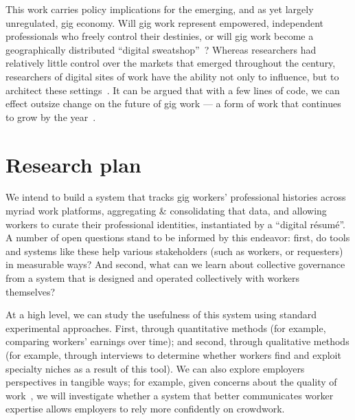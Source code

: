 \documentclass{article}
\newcommand{\topic}[1]{{\color{Blue}#1}}
\begin{document}
\topic{This work carries policy implications for the emerging, and as yet largely unregulated, gig economy.}
Will gig work represent empowered, independent professionals who freely control their destinies, or 
will gig work become a geographically distributed ``digital sweatshop''~\cite{dawnDigitalSweatshopCushing}?
Whereas researchers had relatively little control over the markets that emerged throughout the  century,
researchers of digital sites of work have the ability not only to influence, but to architect these settings~\cite{lessig2006code}.
It can be argued that with a few lines of code, we can effect outsize change on the future of gig work
--- a form of work that continues to grow by the year~\cite{pewSharing,pewSharing24percent}.


\section*{Research plan}
\topic{We intend to build a system that tracks gig workers' professional histories across myriad work platforms,
aggregating \& consolidating that data, and
allowing workers to curate their professional identities, instantiated by a ``digital r\'{e}sum\'{e}''.}
A number of open questions stand to be informed by this endeavor:
first, do tools and systems like these help various stakeholders (such as workers, or requesters) in measurable ways?
And second, what can we learn about collective governance from a system that is designed and operated collectively with workers themselves?

\topic{At a high level, we can study the usefulness of this system using standard experimental approaches.}
First, through quantitative methods (for example, comparing workers' earnings over time); and
second, through qualitative  methods (for example, through interviews to determine whether workers find and exploit specialty niches as a result of this tool).
We can also explore employers perspectives in tangible ways;
for example, given concerns about the quality of work~\cite{Ipeirotis:2010:QMA:1837885.1837906,le2010ensuring,Law:2017:CTR:2998181.2998197},
we will investigate whether a system that better communicates worker expertise allows employers to rely more confidently on crowdwork.
\end{document}
